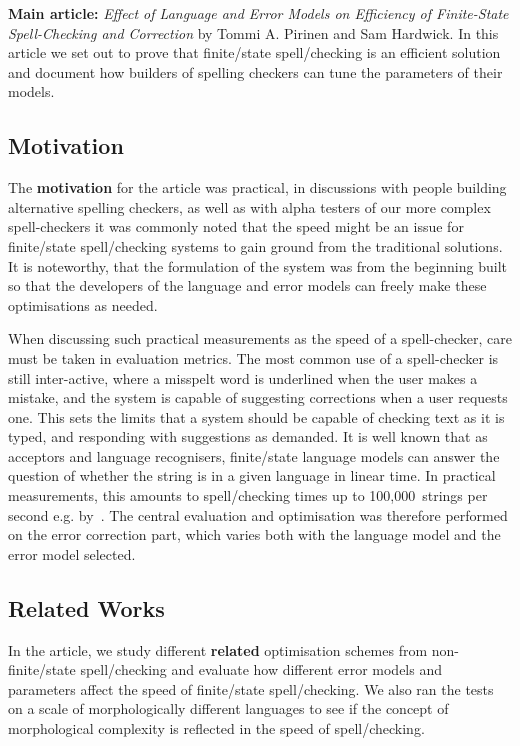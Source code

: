 \documentclass[officiallayout,final]{unihelcompling}
\begin{document}
\textbf{Main article:} \emph{Effect of Language and Error Models on Efficiency
of Finite-State Spell-Checking and Correction} by Tommi A. Pirinen and Sam
Hardwick. In this article we set out to prove that finite\-/state
spell\-/checking is an efficient solution and document how builders of
spelling checkers can tune the parameters of their models.

\subsection{Motivation}

The \textbf{motivation} for the article was practical, in discussions with
people building alternative spelling checkers, as well as with alpha testers of
our more complex spell-checkers it was commonly noted that the speed might be
an issue for finite\-/state spell\-/checking systems to gain ground from the
traditional solutions. It is noteworthy, that the formulation of the system was
from the beginning built so that the developers of the language and error
models can freely make these optimisations as needed.

When discussing such practical measurements as the speed of a spell-checker,
care must be taken in evaluation metrics. The most common use of a
spell-checker is still inter-active, where a misspelt word is underlined when
the user makes a mistake, and the system is capable of suggesting corrections
when a user requests one. This sets the limits that a system should be capable
of checking text as it is typed, and responding with suggestions as demanded.
It is well known that as acceptors and language recognisers, finite\-/state
language models can answer the question of whether the string is in a given
language in linear time. In practical measurements, this amounts to
spell\-/checking times up to 100,000~strings per second e.g.
by~\citet{silfverberg2009hfst}. The central evaluation and optimisation was
therefore performed on the error correction part, which varies both with the
language model and the error model selected.

\subsection{Related Works}

In the article, we study different \textbf{related} optimisation schemes from
non-finite\-/state spell\-/checking and evaluate how different error models and
parameters affect the speed of finite\-/state spell\-/checking. We also ran the
tests on a scale of morphologically different languages to see if the concept
of morphological complexity is reflected in the speed of spell\-/checking.
\end{document}
